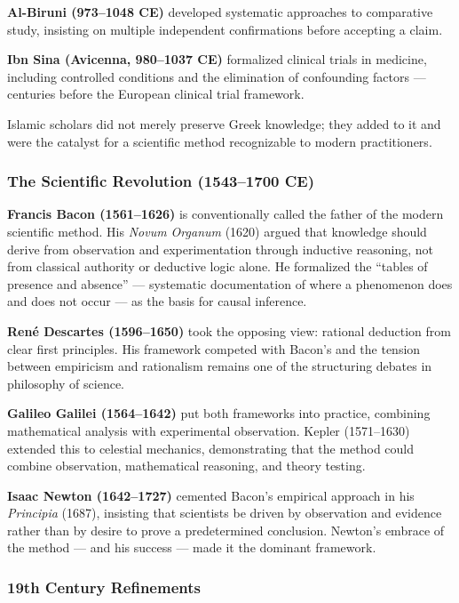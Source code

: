 \documentclass[11pt,letterpaper]{article}
\begin{document}
\textbf{Al-Biruni (973--1048 CE)} developed systematic approaches to comparative study, insisting on multiple independent confirmations before accepting a claim.

\textbf{Ibn Sina (Avicenna, 980--1037 CE)} formalized clinical trials in medicine, including controlled conditions and the elimination of confounding factors --- centuries before the European clinical trial framework.

Islamic scholars did not merely preserve Greek knowledge; they added to it and were the catalyst for a scientific method recognizable to modern practitioners.

\subsubsection{The Scientific Revolution (1543--1700 CE)}

\textbf{Francis Bacon (1561--1626)} is conventionally called the father of the modern scientific method. His \emph{Novum Organum} (1620) argued that knowledge should derive from observation and experimentation through inductive reasoning, not from classical authority or deductive logic alone. He formalized the ``tables of presence and absence'' --- systematic documentation of where a phenomenon does and does not occur --- as the basis for causal inference.

\textbf{René Descartes (1596--1650)} took the opposing view: rational deduction from clear first principles. His framework competed with Bacon's and the tension between empiricism and rationalism remains one of the structuring debates in philosophy of science.

\textbf{Galileo Galilei (1564--1642)} put both frameworks into practice, combining mathematical analysis with experimental observation. Kepler (1571--1630) extended this to celestial mechanics, demonstrating that the method could combine observation, mathematical reasoning, and theory testing.

\textbf{Isaac Newton (1642--1727)} cemented Bacon's empirical approach in his \emph{Principia} (1687), insisting that scientists be driven by observation and evidence rather than by desire to prove a predetermined conclusion. Newton's embrace of the method --- and his success --- made it the dominant framework.

\subsubsection{19th Century Refinements}
\end{document}
